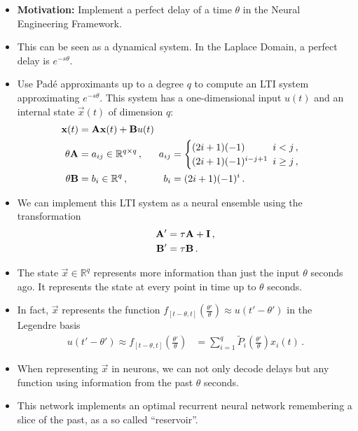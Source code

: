\documentclass[10pt,letterpaper,oneside]{article}
\begin{document}
\begin{itemize}
	\item \textbf{Motivation:} Implement a perfect delay of a time $\theta$ in the Neural Engineering Framework.
	\item This can be seen as a dynamical system. In the Laplace Domain, a perfect delay is $e^{-s\theta}$.
	\item Use Padé approximants up to a degree $q$ to compute an LTI system approximating $e^{-s\theta}$. This system has a one-dimensional input $u(t)$ and an internal state $\vec x(t)$ of dimension $q$:
	\begin{align}
		{\mathbf{x}}(t) &= {\mathbf{A}} {\mathbf{x}}(t) + {\mathbf{B}} u(t) \\
	    \theta {\mathbf{A}} &= a_{ij} \in \mathbb{R}^{q \times q} \,, & \kern-0.5em a_{ij} &= \begin{cases}
		(2i + 1)(-1) & \kern-0.5em i < j \,,\\
		(2i + 1)(-1)^{i - j + 1} & \kern-0.5em i \geq j \,,
		\end{cases}\\
		\theta {\mathbf{B}} &= b_i \in \mathbb{R}^{q} \,, & \kern-0.5em b_i &= (2i + 1)(-1)^i \,.
		\label{eqn:delay_network_lti}
	\end{align}
	\item We can implement this LTI system as a neural ensemble using the transformation
	\begin{align*}
		{\mathbf{A}}' &= \tau {\mathbf{A}} + {\mathbf{I}} \,,\\
		{\mathbf{B}}' &= \tau {\mathbf{B}} \,.
	\end{align*}
	\item The state $\vec x \in \mathbb{R}^q$ represents more information than just the input $\theta$ seconds ago. It represents the state at every point in time up to $\theta$ seconds.
	\item In fact, $\vec x$ represents the function $f_{[t - \theta, t]}\left(\frac{\theta'}{\theta}\right) \approx u\left(t' - \theta' \right)$ in the Legendre basis
	\begin{align*}
		u\left(t' - \theta' \right) \approx f_{[t - \theta, t]}\left(\frac{\theta'}{\theta}\right) &= \sum_{i=1}^q \tilde P_i \left( \frac{\theta'}{\theta} \right) x_i(t) \,.
	\end{align*}
	\item When representing $\vec x$ in neurons, we can not only decode delays but any function using information from the past $\theta$ seconds.
	\item This network implements an optimal recurrent neural network remembering a slice of the past, as a so called \enquote{reservoir}.
\end{itemize}
\end{document}
